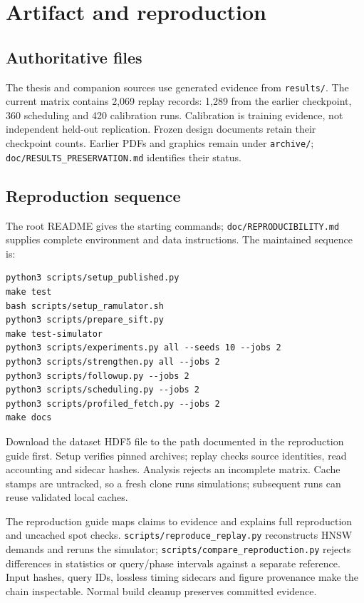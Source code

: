 \documentclass[11pt,a4paper]{report}
\begin{document}
\appendix
\chapter{Artifact and reproduction}
\section{Authoritative files}
The thesis and companion sources use generated evidence from \texttt{results/}. The current matrix contains 2,069 replay records: 1,289 from the earlier checkpoint, 360 scheduling and 420 calibration runs. Calibration is training evidence, not independent held-out replication. Frozen design documents retain their checkpoint counts. Earlier PDFs and graphics remain under \texttt{archive/}; \nolinkurl{doc/RESULTS_PRESERVATION.md} identifies their status.

\section{Reproduction sequence}
The root README gives the starting commands; \nolinkurl{doc/REPRODUCIBILITY.md} supplies complete environment and data instructions. The maintained sequence is:
\begin{lstlisting}
python3 scripts/setup_published.py
make test
bash scripts/setup_ramulator.sh
python3 scripts/prepare_sift.py
make test-simulator
python3 scripts/experiments.py all --seeds 10 --jobs 2
python3 scripts/strengthen.py all --jobs 2
python3 scripts/followup.py --jobs 2
python3 scripts/scheduling.py --jobs 2
python3 scripts/profiled_fetch.py --jobs 2
make docs
\end{lstlisting}
Download the dataset HDF5 file to the path documented in the reproduction guide first. Setup verifies pinned archives; replay checks source identities, read accounting and sidecar hashes. Analysis rejects an incomplete matrix. Cache stamps are untracked, so a fresh clone runs simulations; subsequent runs can reuse validated local caches.

The reproduction guide maps claims to evidence and explains full reproduction and uncached spot checks. \nolinkurl{scripts/reproduce_replay.py} reconstructs HNSW demands and reruns the simulator; \nolinkurl{scripts/compare_reproduction.py} rejects differences in statistics or query/phase intervals against a separate reference. Input hashes, query IDs, lossless timing sidecars and figure provenance make the chain inspectable. Normal build cleanup preserves committed evidence.
\end{document}
